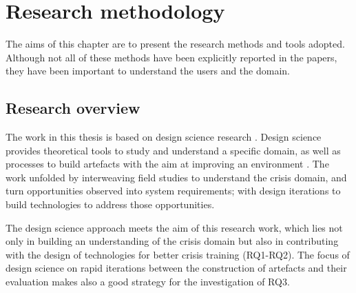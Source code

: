 \chapter{Research methodology}\label{research}


The aims of this chapter are to present the research methods and tools adopted. Although not all of these methods have been explicitly reported in the papers, they have been important to understand the users and the domain.

\section{Research overview}\label{research-overview}

The work in this thesis is based on design science research \autocites{Hevner:2010gc}{March:1995gm}. Design science provides theoretical tools to study and understand a specific domain, as well as processes to build artefacts with the aim at improving an environment \autocite{simon1996sciences}. The work unfolded by interweaving field studies to understand the crisis domain, and turn opportunities observed into system requirements; with design iterations to build technologies to address those opportunities. 

The design science approach meets the aim of this research work, which lies not only in building an understanding of the crisis domain but also in contributing with the design of technologies for better crisis training (RQ1-RQ2). The focus of design science on rapid iterations between the construction of artefacts and their evaluation \autocite{Hevner:2010gc} makes also a good strategy for the investigation of RQ3.

